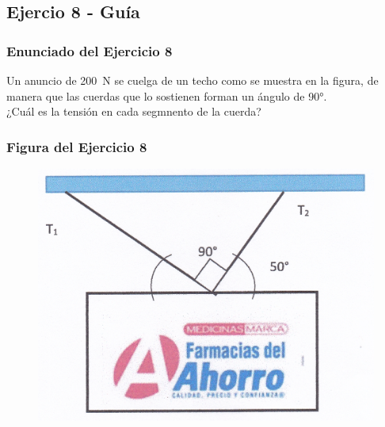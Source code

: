 \documentclass[12pt]{beamer}
\begin{document}
\subsection{Ejercio 8 - Guía}

\begin{frame}
\frametitle{Enunciado del Ejercicio 8}
Un anuncio de \SI{200}{\newton} se cuelga de un techo como se muestra en la figura, de manera que las cuerdas que lo sostienen forman un ángulo de \ang{90}.
\\
\bigskip
\pause
¿Cuál es la tensión en cada segmnento de la cuerda?
\end{frame}
\begin{frame}
\frametitle{Figura del Ejercicio 8}
\begin{figure}
  \centering
  \includegraphics[scale=0.9]{Imagenes/DCL_Problema_08.png}
\end{figure}
\end{frame}
\end{document}
